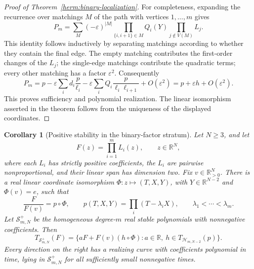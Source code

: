 \documentclass[reqno]{amsart}
\newtheorem{corollary}[theorem]{Corollary}
\theoremstyle{definition}
\theoremstyle{remark}
\newcommand{\R}{\mathbb R}
\begin{document}
\begin{proof}[Proof of Theorem~\ref{herm:binary-localization}]
For completeness, expanding the recurrence over matchings $M$ of
the path with vertices $1,\ldots,m$ gives
\[
 P_m=\sum_M(-\varepsilon)^{|M|}
       \prod_{\{i,i+1\}\in M}Q_i(Y)
       \prod_{j\notin V(M)}L_j.
\]
This identity follows inductively by separating matchings according
to whether they contain the final edge.
The empty matching contributes the first-order changes of the $L_j$;
the single-edge matchings contribute the quadratic terms; every
other matching has a factor $\varepsilon^2$.
Consequently
\[
 P_m=p-\varepsilon\sum_i d_i\frac p{\ell_i}
       -\varepsilon\sum_iQ_i\frac p{\ell_i\ell_{i+1}}
       +O(\varepsilon^2)=p+\varepsilon h+O(\varepsilon^2).
\]
This proves sufficiency and polynomial realization.  The linear
isomorphism asserted in the theorem follows from the uniqueness of
the displayed coordinates.
\end{proof}

\begin{corollary}[Positive stability in the binary-factor stratum]
\label{herm:binary-positive-stability}
Let $N\geq3$, and let
\[
 F(z)=\prod_{i=1}^m L_i(z),\qquad z\in\R^N,
\]
where each $L_i$ has strictly positive coefficients, the $L_i$ are
pairwise nonproportional, and their linear span has dimension two.
Fix $v\in\R_{>0}^N$.
There is a real linear coordinate isomorphism
$\Phi:z\mapsto(T,X,Y)$, with $Y\in\R^{N-2}$ and $\Phi(v)=e$, such
that
\[
 \frac{F}{F(v)}=p\circ\Phi,\qquad
 p(T,X,Y)=\prod_i(T-\lambda_iX),\qquad
 \lambda_1<\cdots<\lambda_m.
\]
Let $\mathcal S^+_{m,N}$ be the homogeneous degree-$m$ real stable
polynomials with nonnegative coefficients.  Then
\begin{equation}\label{herm:binary-positive-tangent}
 T_{\mathcal S^+_{m,N}}(F)
 =\{aF+F(v)(h\circ\Phi):
        a\in\R,\ h\in T_{\mathcal H_{m,N-2}}(p)\}.
\end{equation}
Every direction on the right has a realizing curve with coefficients
polynomial in time, lying in $\mathcal S^+_{m,N}$ for all sufficiently
small nonnegative times.
\end{corollary}
\end{document}
